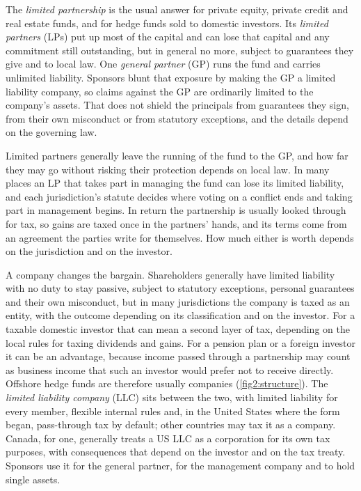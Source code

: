 \begin{chapterrefs}
The \emph{limited partnership} is the usual answer for private equity, private credit and real estate
funds, and for hedge funds sold to domestic investors. Its \emph{limited partners} (LPs) put up most of
the capital and can lose that capital and any commitment still outstanding, but in general no more,
subject to guarantees they give and to local law. One \emph{general partner} (GP) runs the fund and
carries unlimited liability. Sponsors blunt that exposure by making the GP a limited liability company, so claims against the GP
are ordinarily limited to the company's assets. That does not shield the principals from guarantees
they sign, from their own misconduct or from statutory exceptions, and the details depend on the
governing law.

Limited partners generally leave the running of the fund to the GP, and how far they may go without
risking their protection depends on local law. In many places an LP that takes part in managing the
fund can lose its limited liability, and each jurisdiction's statute decides where voting on a
conflict ends and taking part in management begins. In return the partnership is usually looked
through for tax, so gains are taxed once in the partners' hands, and its terms come from an agreement
the parties write for themselves. How much either is worth depends on the jurisdiction and on the investor.

A company changes the bargain. Shareholders generally have limited liability with no duty to stay passive,
subject to statutory exceptions, personal guarantees and their own misconduct,
but in many jurisdictions the company is taxed as an entity, with the outcome depending on its
classification and on the investor. For a taxable domestic investor that can mean a second layer of tax, depending on the local rules for
taxing dividends and gains.
For a pension plan or a foreign investor it can be an advantage, because income passed through a
partnership may count as business income that such an investor would prefer not to receive directly.
Offshore hedge funds are therefore usually companies (\cref{fig2:structure}). The \emph{limited
liability company} (LLC) sits between the two, with limited liability for every member, flexible
internal rules and, in the United States where the form began, pass-through tax by default; other
countries may tax it as a company. Canada, for one, generally treats a US LLC as a corporation for its
own tax purposes, with consequences that depend on the investor and on the tax treaty. Sponsors use it for the general partner,
for the management company and to hold single assets.


\end{chapterrefs}
